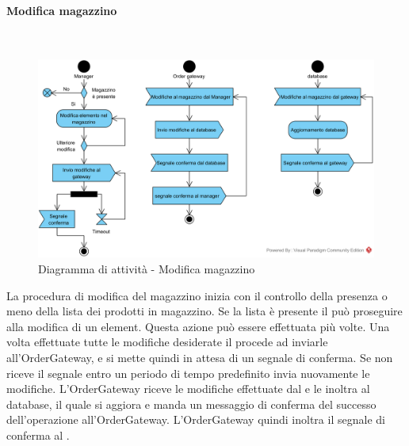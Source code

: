 \paragraph{Modifica magazzino}\mbox{}\\
\nopagebreak
\begin{figure}[H]
	\centering
	\includegraphics[width=14cm]{diagrammi_img/attivita/manager_mag_modifiche.png}
	\caption{Diagramma di attività - Modifica magazzino}
\end{figure}
La procedura di modifica del magazzino inizia con il controllo della presenza o meno della lista dei prodotti in magazzino. Se la lista è presente il \Manager{} può proseguire alla modifica di un element. Questa azione può essere effettuata più volte. Una volta effettuate tutte le modifiche desiderate il \Manager{} procede ad inviarle all'OrderGateway, e si mette quindi in attesa di un segnale di conferma. Se non riceve il segnale entro un periodo di tempo predefinito invia nuovamente le modifiche. L'OrderGateway riceve le modifiche effettuate dal \Manager{} e le inoltra al database, il quale si aggiora e manda un messaggio di conferma del successo dell'operazione all'OrderGateway. L'OrderGateway quindi inoltra il segnale di conferma al \Manager{}.

